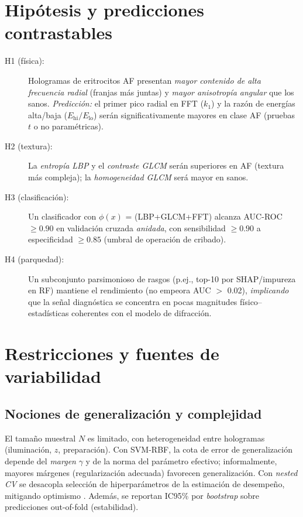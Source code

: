 \section{Hipótesis y predicciones contrastables}
\label{sec:hipotesis}
\begin{description}
\item[H1 (física):] Hologramas de eritrocitos AF presentan \emph{mayor contenido de alta frecuencia radial} (franjas más juntas) y \emph{mayor anisotropía angular} que los sanos. \emph{Predicción:} el primer pico radial en FFT ($k_1$) y la razón de energías alta/baja ($E_\text{hi}/E_\text{lo}$) serán significativamente mayores en clase AF (pruebas $t$ o no paramétricas).
\item[H2 (textura):] La \emph{entropía LBP} y el \emph{contraste GLCM} serán superiores en AF (textura más compleja); la \emph{homogeneidad GLCM} será mayor en sanos. 
\item[H3 (clasificación):] Un clasificador con $\phi(x)$ = (LBP+GLCM+FFT) alcanza AUC-ROC $\ge 0.90$ en validación cruzada \emph{anidada}, con sensibilidad $\ge 0.90$ a especificidad $\ge 0.85$ (umbral de operación de cribado).
\item[H4 (parquedad):] Un subconjunto parsimonioso de rasgos (p.ej., top-10 por SHAP/impureza en RF) mantiene el rendimiento (no empeora AUC $>$ 0.02), \emph{implicando} que la señal diagnóstica se concentra en pocas magnitudes físico–estadísticas coherentes con el modelo de difracción.
\end{description}

\section{Restricciones y fuentes de variabilidad}
\subsection{Nociones de generalización y complejidad}
El tamaño muestral $N$ es limitado, con heterogeneidad entre hologramas (iluminación, $z$, preparación). Con SVM-RBF, la cota de error de generalización depende del \emph{margen} $\gamma$ y de la norma del parámetro efectivo; informalmente, mayores márgenes (regularización adecuada) favorecen generalización. Con \emph{nested CV} se desacopla selección de hiperparámetros de la estimación de desempeño, mitigando optimismo \cite{Tsamardinos2022Patterns}. Además, se reportan IC95\% por \emph{bootstrap} sobre predicciones out-of-fold (estabilidad).

